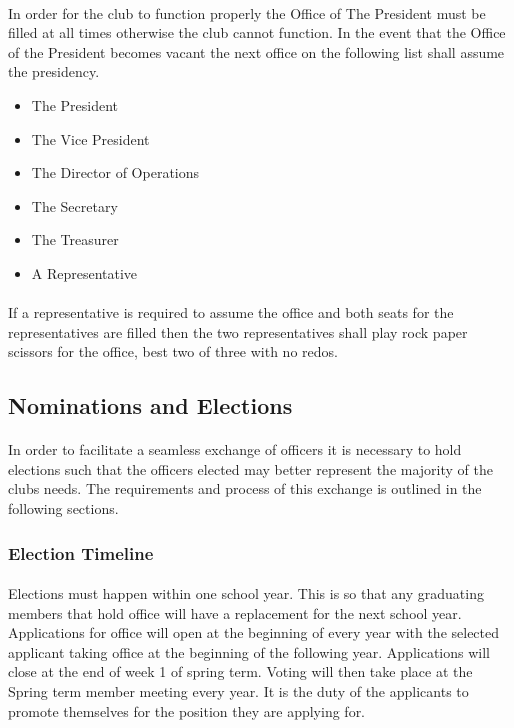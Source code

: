 \documentclass[12pt]{article}
\begin{document}
\paragraph{}
In order for the club to function properly the Office of The President must be filled at all times
otherwise the club cannot function. In the event that the Office of the President becomes vacant
the next office on the following list shall assume the presidency. 

\begin{itemize}
\item The President
\item The Vice President
\item The Director of Operations
\item The Secretary
\item The Treasurer
\item A Representative
\end{itemize}

\paragraph{}
If a representative is required to assume the office and both seats for the representatives are 
filled then the two representatives shall play rock paper scissors for the office, best two of three
with no redos.

 
\subsection{Nominations and Elections}
\paragraph{}
In order to facilitate a seamless exchange of officers it is necessary to hold elections such that the officers elected may better represent the majority of the clubs needs. The requirements and process of this exchange is outlined in the following sections.

\subsubsection{Election Timeline}
\paragraph{}
Elections must happen within one school year. This is so that any graduating members that hold office will have a replacement for the next school year. Applications for office will open at the 
beginning of every year with the selected applicant taking office at the beginning of the following 
year. Applications will close at the end of week 1 of spring term. Voting will then take place at the Spring term member meeting every year.
It is the duty of the applicants to promote themselves for the position they are applying for. 
\end{document}
